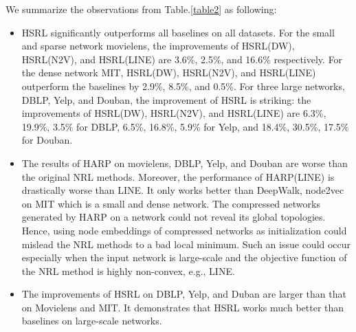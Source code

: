 \documentclass[conference]{IEEEtran}
\begin{document}
We summarize the observations from Table.\ref{table2} as following:
\begin{itemize}
	\item HSRL significantly outperforms all baselines on all datasets. For the small and sparse network movielens, the improvements of HSRL(DW), HSRL(N2V), and HSRL(LINE) are 3.6\%, 2.5\%, and 16.6\% respectively. For the dense network MIT, HSRL(DW), HSRL(N2V), and HSRL(LINE) outperform the baselines by 2.9\%, 8.5\%, and 0.5\%. For three large networks, DBLP, Yelp, and Douban, the improvement of HSRL is striking: the improvements of HSRL(DW), HSRL(N2V), and HSRL(LINE) are 6.3\%, 19.9\%, 3.5\% for DBLP, 6.5\%, 16.8\%, 5.9\% for Yelp, and 18.4\%, 30.5\%, 17.5\% for Douban. 
	
	\item The results of HARP on movielens, DBLP, Yelp, and Douban are worse than the original NRL methods. Moreover, the performance of HARP(LINE) is drastically worse than LINE. It only works better than DeepWalk, node2vec on MIT which is a small and dense network. The compressed networks generated by HARP on a network could not reveal its global topologies. Hence, using node embeddings of compressed networks as initialization could mislead the NRL methods to a bad local minimum. Such an issue could occur especially when the input network is large-scale and the objective function of the NRL method is highly non-convex, e.g., LINE.
	
	\item The improvements of HSRL on DBLP, Yelp, and Duban are larger than that on Movielens and MIT. It demonstrates that HSRL works much better than baselines on large-scale networks. 
\end{itemize}
\end{document}
